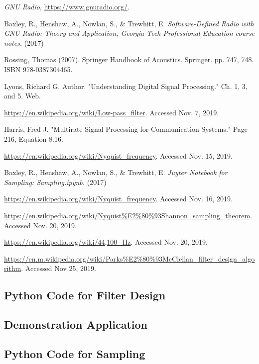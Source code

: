 \begin{thebibliography}{1}

\emph{GNU Radio}, \url{https://www.gnuradio.org/}.

 Baxley, R., Henshaw, A., Nowlan, S., \&
Trewhitt, E. \emph{Software-Defined Radio with GNU Radio: Theory
and Application, Georgia Tech Professional Education course
notes.} (2017)

 Rossing, Thomas (2007). Springer Handbook of
Acoustics. Springer. pp. 747, 748. ISBN 978-0387304465.

 Lyons, Richard G. Author. "Understanding
Digital Signal Processing." Ch. 1, 3, and 5. Web.

\url{https://en.wikipedia.org/wiki/Low-pass_filter}. Accessed
Nov. 7, 2019.

 Harris, Fred J. "Multirate Signal Processing
for Communication Systems." Page 216, Equation 8.16.

\url{https://en.wikipedia.org/wiki/Nyquist_frequency}. Accessed
Nov. 15, 2019.

 Baxley, R., Henshaw, A., Nowlan, S.,
\& Trewhitt, E. \emph{Juyter Notebook for Sampling:
Sampling.ipynb.} (2017)

\url{https://en.wikipedia.org/wiki/Nyquist_frequency}. Accessed
Nov. 16, 2019.

\url{https://en.wikipedia.org/wiki/Nyquist\%E2\%80\%93Shannon_sampling_theorem}.
Accessed Nov. 20, 2019.

 \url{https://en.wikipedia.org/wiki/44,100_Hz}.
Accessed Nov. 20, 2019.

 \url{https://en.m.wikipedia.org/wiki/Parks\%E2\%80\%93McClellan_filter_design_algorithm}.
Accessed Nov 25, 2019.
\end{thebibliography}

\newpage

\onecolumn 
\appendix 

\subsection{Python Code for Filter Design\cite{notes:class}}


\newpage
\subsection{Demonstration Application}


\newpage
\subsection{Python Code for Sampling\cite{notes:class}}





